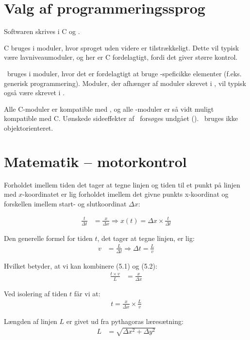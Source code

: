 \section{Valg af programmeringssprog}

Softwaren skrives i C og \Cpp.

C bruges i moduler, hvor sproget uden videre er tilstrækkeligt. Dette
vil typisk være lavniveaumoduler, og her er C fordelagtigt, fordi det
giver større kontrol.

\Cpp\ bruges i moduler, hvor det er fordelagtigt at bruge
\Cpp-speficikke elementer (f.eks. generisk programmering). Moduler, der afhænger af moduler skrevet i \Cpp, vil
typisk også være skrevet i \Cpp.

Alle C-moduler er kompatible med \Cpp, og alle \Cpp-moduler er så vidt
muligt kompatible med C. Uønskede sideeffekter af \Cpp\ forsøges
undgået (). \Cpp\ bruges ikke objektorienteret.

\section{Matematik -- motorkontrol}

Forholdet imellem tiden det tager at tegne linjen og tiden til et
punkt på linjen med $x$-koordinatet er lig forholdet imellem det givne
punkts x-koordinat og forskellen imellem start- og slutkoordinat $\Delta x$:

\begin{align}
\frac{t}{\Delta t} &= \frac{x}{\Delta x} \Rightarrow x(t) = \Delta x \times \frac{t}{\Delta t}
\end{align}

Den generelle formel for tiden $t$, det tager at tegne linjen, er lig:
\begin{align}
v &= \frac{L}{\Delta t} \Rightarrow \Delta t= \frac{L}{v}
\end{align}

Hvilket betyder, at vi kan kombinere (5.1) og (5.2):
\begin{align*}
\frac{t \times v}{L} &= \frac{x}{\Delta x}
\end{align*}

Ved isolering af tiden $t$ får vi at:
\begin{align}
t = \frac{x}{\Delta x} \times \frac{L}{v}
\end{align}

Længden af linjen $L$ er givet ud fra pythagoras læresætning:
\begin{align*}
L &= \sqrt{\Delta x^2+\Delta y^2}
\end{align*}

